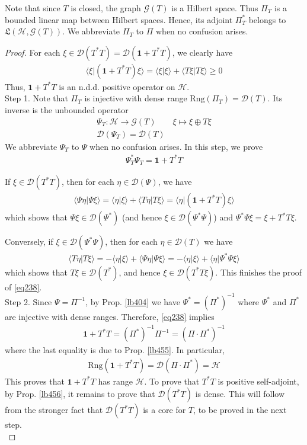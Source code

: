 \documentclass[12pt,b5paper,notitlepage]{article}
\theoremstyle{definition}
\theoremstyle{plain}
\newcommand{\fk}{\mathfrak}
\newcommand{\idt}{\mathbf{1}}
\newcommand{\Dom}{\mathscr{D}}
\newcommand{\bk}[1]{\langle {#1}\rangle}
\newcommand{\Rng}{\mathrm{Rng}}
\newcommand{\MH}{\mathcal H}
\newcommand{\SG}{\mathscr G}
\numberwithin{equation}{section}
\begin{document}
Note that since $T$ is closed, the graph $\SG(T)$ is a Hilbert space. Thus $\Pi_T$ is a bounded linear map between Hilbert spaces. Hence, its adjoint $\Pi_T^*$ belongs to $\fk L(\MH,\SG(T))$. We abbreviate $\Pi_T$ to $\Pi$ when no confusion arises.

\begin{proof}
For each $\xi\in\Dom(T^*T)=\Dom(\idt+T^*T)$, we clearly have
\begin{align*}
\bk{\xi|(\idt+T^*T)\xi}=\bk{\xi|\xi}+\bk{T\xi|T\xi}\geq0
\end{align*}
Thus, $\idt+T^*T$ is an n.d.d. positive operator on $\MH$.\\[-1ex]

Step 1. Note that $\Pi_T$ is injective with dense range $\Rng(\Pi_T)=\Dom(T)$. Its inverse is the unbounded operator
\begin{gather*}
\Psi_T:\MH\rightarrow\SG(T)\qquad \xi\mapsto \xi\oplus T\xi\\
\Dom(\Psi_T)=\Dom(T)
\end{gather*}
We abbreviate $\Psi_T$ to $\Psi$ when no confusion arises. In this step, we prove
\begin{align}\label{eq238}
\Psi_T^*\Psi_T=\idt+T^*T
\end{align}

If $\xi\in\Dom(T^*T)$, then for each $\eta\in\Dom(\Psi)$, we have
\begin{align*}
\bk{\Psi\eta|\Psi\xi}=\bk{\eta|\xi}+\bk{T\eta|T\xi}=\bk{\eta|(\idt+T^*T)\xi}
\end{align*}
which shows that $\Psi\xi\in\Dom(\Psi^*)$ (and hence $\xi\in\Dom(\Psi^*\Psi)$) and $\Psi^*\Psi\xi=\xi+T^*T\xi$.

Conversely, if $\xi\in\Dom(\Psi^*\Psi)$, then for each $\eta\in\Dom(T)$ we have
\begin{align*}
\bk{T\eta|T\xi}=-\bk{\eta|\xi}+\bk{\Psi\eta|\Psi\xi}=-\bk{\eta|\xi}+\bk{\eta|\Psi^*\Psi\xi}
\end{align*}
which shows that $T\xi\in\Dom(T^*)$, and hence $\xi\in\Dom(T^*T\xi)$. This finishes the proof of \eqref{eq238}.\\[-1ex]

Step 2. Since $\Psi=\Pi^{-1}$, by Prop. \ref{lb404} we have $\Psi^*=(\Pi^*)^{-1}$ where $\Psi^*$ and $\Pi^*$ are injective with dense ranges. Therefore, \eqref{eq238} implies
\begin{align}\label{eq239}
\idt+T^*T=(\Pi^*)^{-1}\Pi^{-1}=(\Pi\cdot\Pi^*)^{-1}
\end{align}
where the last equality is due to Prop. \ref{lb455}. In particular,
\begin{align*}
\Rng(\idt+T^*T)=\Dom(\Pi\cdot\Pi^*)=\MH
\end{align*}
This proves that $\idt+T^*T$ has range $\MH$. To prove that $T^*T$ is positive self-adjoint, by Prop. \ref{lb456}, it remains to prove that $\Dom(T^*T)$ is dense. This will follow from the stronger fact that $\Dom(T^*T)$ is a core for $T$, to be proved in the next step.\\[-1ex]


\end{proof}
\end{document}
